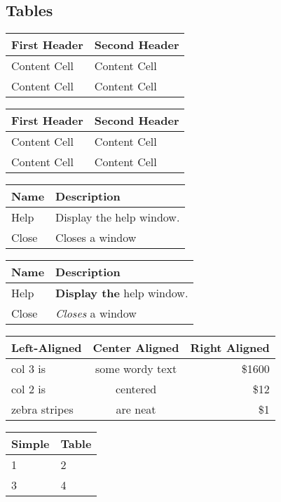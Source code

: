 \subsection{Tables}

\noindent\begin{tabular}{|l|l|}\hline
First Header  & Second Header\\ \hline
Content Cell  & Content Cell\\ \hline
Content Cell  & Content Cell\\ \hline
\end{tabular}

\noindent\begin{tabular}{|l|l|}\hline
First Header  & Second Header\\ \hline
Content Cell  & Content Cell\\ \hline
Content Cell  & Content Cell\\ \hline
\end{tabular}

\noindent\begin{tabular}{|l|l|}\hline
Name & Description\\ \hline
Help      & Display the help window.\\ \hline
Close     & Closes a window\\ \hline
\end{tabular}

\noindent\begin{tabular}{|l|l|}\hline
Name & Description\\ \hline
Help      & \textbf{Display the} help window.\\ \hline
Close     & \textit{Closes} a window\\ \hline
\end{tabular}

\noindent\begin{tabular}{|l|c|r|}\hline
Left-Aligned  & Center Aligned  & Right Aligned\\ \hline
col 3 is      & some wordy text & \$1600\\ \hline
col 2 is      & centered        &   \$12\\ \hline
zebra stripes & are neat        &    \$1\\ \hline
\end{tabular}

\noindent\begin{tabular}{|l|l|}\hline
Simple & Table\\ \hline
1      & 2\\ \hline
3      & 4\\ \hline
\end{tabular}

